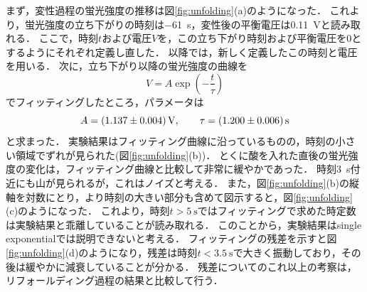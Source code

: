 \documentclass[a4paper,11pt, titlepage]{jsarticle}
\begin{document}
まず，変性過程の蛍光強度の推移は図\ref{fig:unfolding}(a)のようになった．
これより，蛍光強度の立ち下がりの時刻は\SI{-61}{\second}，変性後の平衡電圧は\SI{0.11}{\volt}と読み取れる．
ここで，時刻$t$および電圧$V$を，この立ち下がり時刻および平衡電圧を0とするようにそれぞれ定義し直した．
以降では，新しく定義したこの時刻と電圧を用いる．
次に，立ち下がり以降の蛍光強度の曲線を
\begin{equation}
    V = A\exp(-\frac{t}{\tau})
\end{equation}
でフィッティングしたところ，パラメータは
\begin{equation}
    A = \SI[separate-uncertainty]{1.137 \pm 0.004}{\volt}, \qquad
    \tau = \SI[separate-uncertainty]{1.200 \pm 0.006}{\second}
\end{equation}
と求まった．
実験結果はフィッティング曲線に沿っているものの，時刻の小さい領域でずれが見られた(図\ref{fig:unfolding}(b))．
とくに酸を入れた直後の蛍光強度の変化は，フィッティング曲線と比較して非常に緩やかであった．
時刻\SI{3}{\second}付近にも山が見られるが，これはノイズと考える．
また，図\ref{fig:unfolding}(b)の縦軸を対数にとり，より時刻の大きい部分も含めて図示すると，図\ref{fig:unfolding}(c)のようになった．
これより，時刻$t > \SI{5}{\second}$ではフィッティングで求めた時定数は実験結果と乖離していることが読み取れる．
このことから，実験結果はsingle exponentialでは説明できないと考える．
フィッティングの残差を示すと図\ref{fig:unfolding}(d)のようになり，残差は時刻$t < \SI{3.5}{\second}$で大きく振動しており，その後は緩やかに減衰していることが分かる．
残差についてのこれ以上の考察は，リフォールディング過程の結果と比較して行う．
\end{document}
